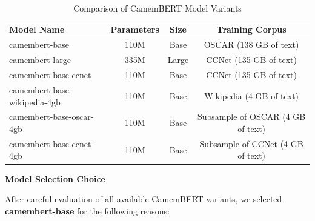 \documentclass[12pt,a4paper]{article}
\begin{document}
\begin{table}[H]
\centering
\begin{tabular}{|l|c|c|c|}
\hline
\textbf{Model Name} & \textbf{Parameters} & \textbf{Size} & \textbf{Training Corpus} \\
\hline
camembert-base & 110M & Base & OSCAR (138 GB of text) \\
\hline
camembert-large & 335M & Large & CCNet (135 GB of text) \\
\hline
camembert-base-ccnet & 110M & Base & CCNet (135 GB of text) \\
\hline
camembert-base-wikipedia-4gb & 110M & Base & Wikipedia (4 GB of text) \\
\hline
camembert-base-oscar-4gb & 110M & Base & Subsample of OSCAR (4 GB of text) \\
\hline
camembert-base-ccnet-4gb & 110M & Base & Subsample of CCNet (4 GB of text) \\
\hline
\end{tabular}
\caption{Comparison of CamemBERT Model Variants}
\end{table}

\textbf{Model Selection Choice}

After careful evaluation of all available CamemBERT variants, we selected \textbf{camembert-base} for the following reasons:
\end{document}
